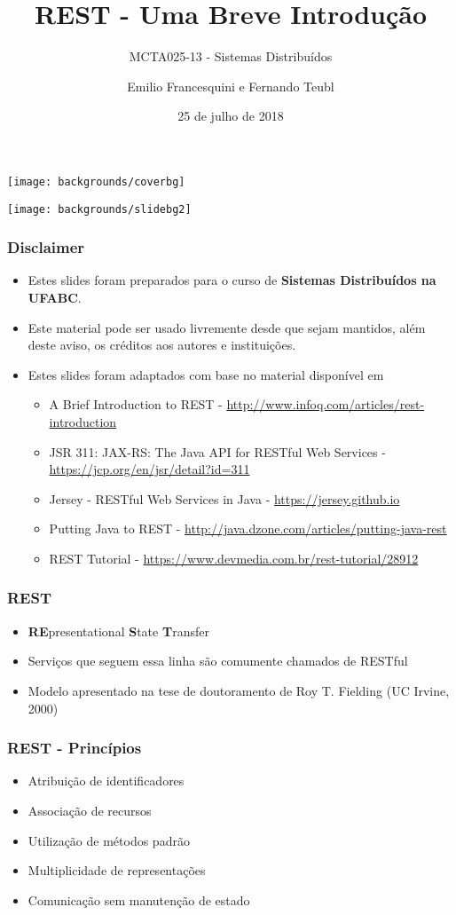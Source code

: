 \documentclass[Ligatures=TeX,table,brazil,svgnames,usetotalslideindicator,comp
ress,10pt]{beamer}
\title{REST - Uma Breve Introdução}
\subtitle{MCTA025-13 - Sistemas Distribuídos}
\author{Emilio Francesquini e Fernando Teubl}
\institute{Centro de Matemática, Computação e Cognição\\ Universidade Federal do ABC}
\date{25 de julho de 2018}
\newcommand{\setcoverbg}{
    \setbeamertemplate{background}
     {\texttt{[image: backgrounds/coverbg]}}
}
\newcommand{\setsectionbg}{
    \setbeamertemplate{background}
     {\texttt{[image: backgrounds/slidebg2]}}
}
\begin{document}
\setcoverbg
\maketitle

\setsectionbg

\begin{frame}
  \frametitle{Disclaimer}
  \begin{itemize}
  \item Estes slides foram preparados para o curso de \textbf{Sistemas
      Distribuídos na UFABC}.
  \item Este material pode ser usado livremente desde que sejam
    mantidos, além deste aviso, os créditos aos autores e
    instituições.
  \item Estes slides foram adaptados com base no material disponível
    em
    \begin{itemize}
      \item A Brief Introduction to REST - \url{http://www.infoq.com/articles/rest-introduction}
      \item JSR 311: JAX-RS: The Java API for RESTful Web Services - \url{https://jcp.org/en/jsr/detail?id=311}
      \item Jersey - RESTful Web Services in Java - \url{https://jersey.github.io}
      \item Putting Java to REST - \url{http://java.dzone.com/articles/putting-java-rest}
      \item REST Tutorial - \url{https://www.devmedia.com.br/rest-tutorial/28912}
    \end{itemize}
  \end{itemize}
\end{frame}

\begin{frame}
  \frametitle{REST}
  \begin{itemize}
  \item \textbf{RE}presentational \textbf{S}tate \textbf{T}ransfer
  \item Serviços que seguem essa linha são comumente chamados de
    RESTful
  \item Modelo apresentado na tese de doutoramento de
    Roy T. Fielding (UC Irvine, 2000)
  \end{itemize}
\end{frame}


\begin{frame}
  \frametitle{REST - Princípios}
  \begin{itemize}
  \item Atribuição de identificadores
  \item Associação de recursos
  \item Utilização de métodos padrão
  \item Multiplicidade de representações
  \item Comunicação sem manutenção de estado
  \end{itemize}
\end{frame}
\end{document}
